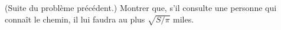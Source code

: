 (Suite du problème précédent.) Montrer que, s'il consulte une personne qui connaît le chemin, il lui faudra au plus $\sqrt{S/\pi}$ miles.
